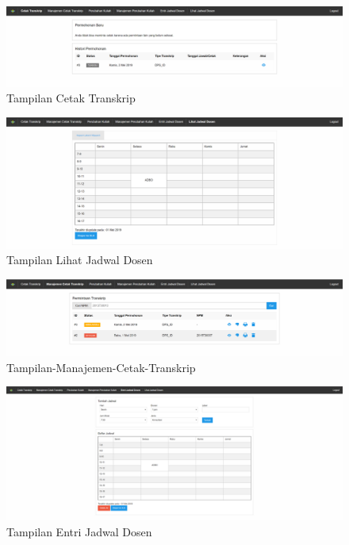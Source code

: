 \documentclass[a4paper,twoside]{article}
\begin{document}
\begin{figure}[h]
	\includegraphics [scale=0.5] {Tampilan-Cetak-Transkrip.PNG}
	\caption{Tampilan Cetak Transkrip}
\end{figure}

\begin{figure}[h]
	\includegraphics [scale=0.5] {Tampilan-Lihat-Jadwal-Dosen.PNG}
	\caption{Tampilan Lihat Jadwal Dosen}
\end{figure}

\begin{figure}[h]
	\includegraphics [scale=0.5] {Tampilan-Manajemen-Cetak-Transkrip.PNG}
	\caption{Tampilan-Manajemen-Cetak-Transkrip}
\end{figure}

\begin{figure}[h]
	\includegraphics [scale=0.5] {Tampilan-Entri-Jadwal-Dosen.PNG}
	\caption{Tampilan Entri Jadwal Dosen}
\end{figure}
\end{document}
